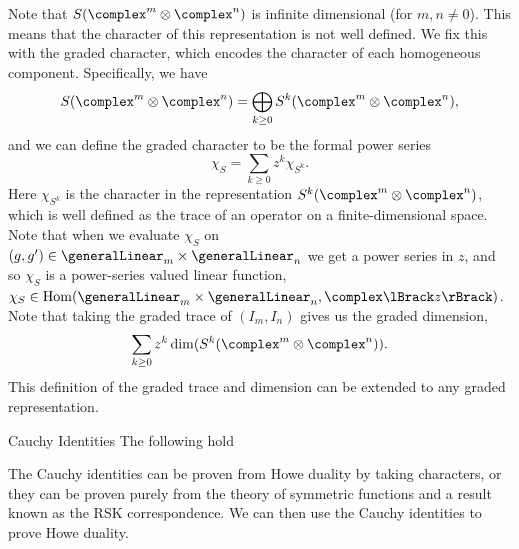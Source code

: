Note that \(S(\complex^m \otimes \complex^n)\) is infinite dimensional (for \(m, n \ne 0\)).
This means that the character of this representation is not well defined.
We fix this with the graded character, which encodes the character of each homogeneous component.
Specifically, we have
\begin{equation}
    S(\complex^m \otimes \complex^n) = \bigoplus_{k \ge 0} S^k(\complex^m \otimes \complex^n),
\end{equation}
and we can define the graded character to be the formal power series
\begin{equation}
    \chi_S = \sum_{k \ge 0} z^k \chi_{S^k}.
\end{equation}
Here \(\chi_{S^k}\) is the character in the representation \(S^k(\complex^m \otimes \complex^n)\), which is well defined as the trace of an operator on a finite-dimensional space.
Note that when we evaluate \(\chi_S\) on \((g, g') \in \generalLinear_m \times \generalLinear_n\) we get a power series in \(z\), and so \(\chi_S\) is a power-series valued linear function, \(\chi_S \in \Hom(\generalLinear_m \times \generalLinear_n, \complex \lBrack z \rBrack)\).
Note that taking the graded trace of \((I_m, I_n)\) gives us the graded dimension,
\begin{equation}
    \sum_{k \ge 0} z^k \dim(S^k(\complex^m \otimes \complex^n)).
\end{equation}
This definition of the graded trace and dimension can be extended to any graded representation.

\begin{prp}{Cauchy Identities}{}
    The following hold
\end{prp}

The Cauchy identities can be proven from Howe duality by taking characters, or they can be proven purely from the theory of symmetric functions and a result known as the RSK correspondence.
We can then use the Cauchy identities to prove Howe duality.


